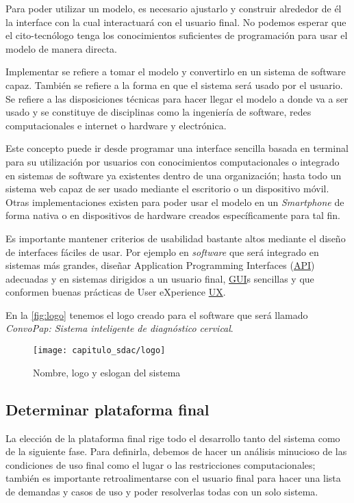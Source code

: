 Para poder utilizar un modelo, es necesario ajustarlo y construir alrededor de
él la interface con la cual interactuará con el usuario final. No podemos
esperar que el cito-tecnólogo tenga los conocimientos suficientes de
programación para usar el modelo de manera directa.

Implementar se refiere a tomar el modelo y convertirlo en un sistema de software
capaz. También se refiere a la forma en que el sistema será usado por el
usuario. Se refiere a las disposiciones técnicas para hacer llegar el modelo a
donde va a ser usado y se constituye de disciplinas como la ingeniería de
software, redes computacionales e internet o hardware y electrónica. 

Este concepto puede ir desde programar una interface sencilla basada en terminal
para su utilización por usuarios con conocimientos computacionales o integrado
en sistemas de software ya existentes dentro de una organización; hasta todo un
sistema web capaz de ser usado mediante el escritorio o un dispositivo móvil.
Otras implementaciones existen para poder usar el modelo en un
\emph{Smartphone} de forma nativa o en dispositivos de hardware creados
específicamente para tal fin.

Es importante mantener criterios de usabilidad bastante altos mediante el diseño
de interfaces fáciles de usar. Por ejemplo en \emph{software} que será integrado
en sistemas más grandes, diseñar Application Programming Interfaces
(\hyperlink{abbr}{API})
adecuadas y en sistemas dirigidos a un usuario final, \hyperlink{abbr}{GUI}s
sencillas y que conformen buenas prácticas de User eXperience \hyperlink{abbr}{UX}.

En la \autoref{fig:logo} tenemos el logo creado para el software que será
llamado \emph{ConvoPap: Sistema inteligente de diagnóstico cervical}.

\begin{figure}[H]
    \centering
    \texttt{[image: capitulo\_sdac/logo]}
    \caption{Nombre, logo y eslogan del sistema}\label{fig:logo}
\end{figure}

\subsection{Determinar plataforma final}
La elección de la plataforma final rige todo el desarrollo tanto del sistema
como de la siguiente fase. Para definirla, debemos de hacer un análisis
minucioso de las condiciones de uso final como el lugar o las restricciones
computacionales; también es importante retroalimentarse con el usuario final
para hacer una lista de demandas y casos de uso y poder resolverlas todas con un
solo sistema.

